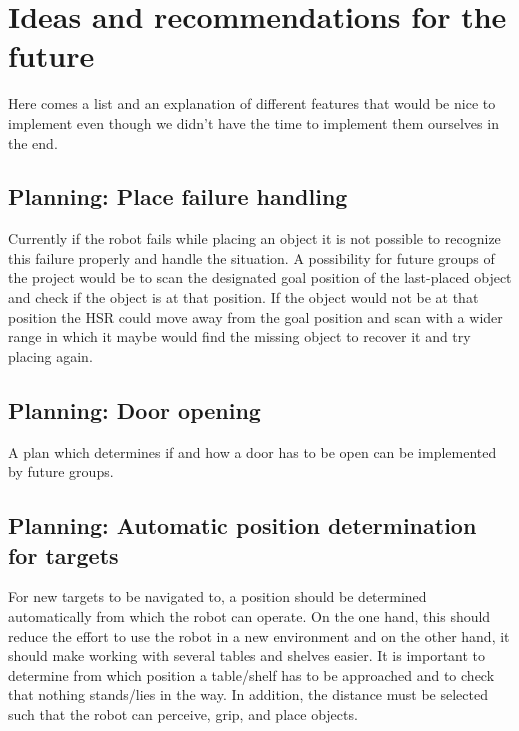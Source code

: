 \documentclass[main.tex]{subfiles}
\begin{document}
	\begingroup

	\renewcommand{\cleardoublepage}{}

	\renewcommand{\clearpage}{}

	\chapter{Ideas and recommendations for the future}
		
		Here comes a list and an explanation of different features that would be nice to implement even though we didn't have the time to implement them ourselves in the end.
		
		\section{Planning: Place failure handling}
		Currently if the robot fails while placing an object it is not possible to recognize this failure properly and handle the situation. A possibility for future groups of the project would be to scan the designated goal position of the last-placed object and check if the object is at that position. If the object would not be at that position the HSR could move away from the goal position and scan with a wider range in which it maybe would find the missing object to recover it and try placing again.
		
		\section{Planning: Door opening}
		A plan which determines if and how a door has to be open can be implemented by future groups.
		
		\section{Planning: Automatic position determination for targets}
		For new targets to be navigated to, a position should be determined automatically from which the robot can operate. On the one hand, this should reduce the effort to use the robot in a new environment and on the other hand, it should make working with several tables and shelves easier. It is important to determine from which position a table/shelf has to be approached and to check that nothing stands/lies in the way. In addition, the distance must be selected such that the robot can perceive, grip, and place objects.	
		
\end{document}
